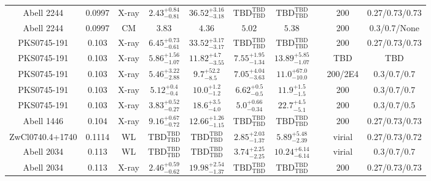 \begin{table}
\begin{tabular}{cccccccccc}
Abell 2244 & 0.0997 & X-ray & ${2.43}^{+0.84}_{-0.81}$ & ${36.52}^{+3.16}_{-3.18}$ & ${\mathrm{TBD}}^{\mathrm{TBD}}_{\mathrm{TBD}}$ & ${\mathrm{TBD}}^{\mathrm{TBD}}_{\mathrm{TBD}}$ & \citet{BA14.1} & 200 & 0.27/0.73/0.73 \\
Abell 2244 & 0.0997 & CM & ${3.83}^{}_{}$ & ${4.36}^{}_{}$ & ${5.02}^{}_{}$ & ${5.38}^{}_{}$ & \citet{RI06.1} & 200 & 0.3/0.7/None \\
PKS0745-191 & 0.103 & X-ray & ${6.45}^{+0.73}_{-0.61}$ & ${33.52}^{+3.17}_{-3.17}$ & ${\mathrm{TBD}}^{\mathrm{TBD}}_{\mathrm{TBD}}$ & ${\mathrm{TBD}}^{\mathrm{TBD}}_{\mathrm{TBD}}$ & \citet{BA14.1} & 200 & 0.27/0.73/0.73 \\
PKS0745-191 & 0.103 & X-ray & ${5.86}^{+1.56}_{-1.07}$ & ${11.82}^{+4.7}_{-3.55}$ & ${7.55}^{+1.95}_{-1.34}$ & ${13.89}^{+5.85}_{-1.07}$ & \citet{SC06.1} & TBD & TBD \\
PKS0745-191 & 0.103 & X-ray & ${5.46}^{+3.22}_{-2.88}$ & ${9.7}^{+52.2}_{-8.5}$ & ${7.05}^{+4.04}_{-3.63}$ & ${11.0}^{+67.0}_{-10.0}$ & \citet{VO06.1} & 200/2E4 & 0.3/0.7/0.7 \\
PKS0745-191 & 0.103 & X-ray & ${5.12}^{+0.4}_{-0.4}$ & ${10.0}^{+1.2}_{-1.2}$ & ${6.62}^{+0.5}_{-0.5}$ & ${11.9}^{+1.5}_{-1.5}$ & \citet{PO05.1} & 200 & 0.3/0.7/0.7 \\
PKS0745-191 & 0.103 & X-ray & ${3.83}^{+0.52}_{-0.27}$ & ${18.6}^{+3.5}_{-4.0}$ & ${5.0}^{+0.66}_{-0.34}$ & ${22.7}^{+4.5}_{-5.1}$ & \citet{AL03.1} & 200 & 0.3/0.7/0.5 \\
Abell 1446 & 0.104 & X-ray & ${9.16}^{+0.67}_{-0.72}$ & ${12.66}^{+1.26}_{-1.15}$ & ${\mathrm{TBD}}^{\mathrm{TBD}}_{\mathrm{TBD}}$ & ${\mathrm{TBD}}^{\mathrm{TBD}}_{\mathrm{TBD}}$ & \citet{BA14.1} & 200 & 0.27/0.73/0.73 \\
ZwCl0740.4+1740 & 0.1114 & WL & ${\mathrm{TBD}}^{\mathrm{TBD}}_{\mathrm{TBD}}$ & ${\mathrm{TBD}}^{\mathrm{TBD}}_{\mathrm{TBD}}$ & ${2.85}^{+2.03}_{-1.37}$ & ${5.89}^{+5.48}_{-2.39}$ & \citet{OK10.1} & virial & 0.27/0.73/0.72 \\
Abell 2034 & 0.113 & WL & ${\mathrm{TBD}}^{\mathrm{TBD}}_{\mathrm{TBD}}$ & ${\mathrm{TBD}}^{\mathrm{TBD}}_{\mathrm{TBD}}$ & ${3.74}^{+2.25}_{-2.25}$ & ${10.24}^{+6.14}_{-6.14}$ & \citet{OK08.1} & virial & 0.3/0.7/0.7 \\
Abell 2034 & 0.113 & X-ray & ${2.46}^{+0.59}_{-0.62}$ & ${19.98}^{+2.54}_{-1.37}$ & ${\mathrm{TBD}}^{\mathrm{TBD}}_{\mathrm{TBD}}$ & ${\mathrm{TBD}}^{\mathrm{TBD}}_{\mathrm{TBD}}$ & \citet{BA14.1} & 200 & 0.27/0.73/0.73 \\

\end{tabular}
\end{table}
